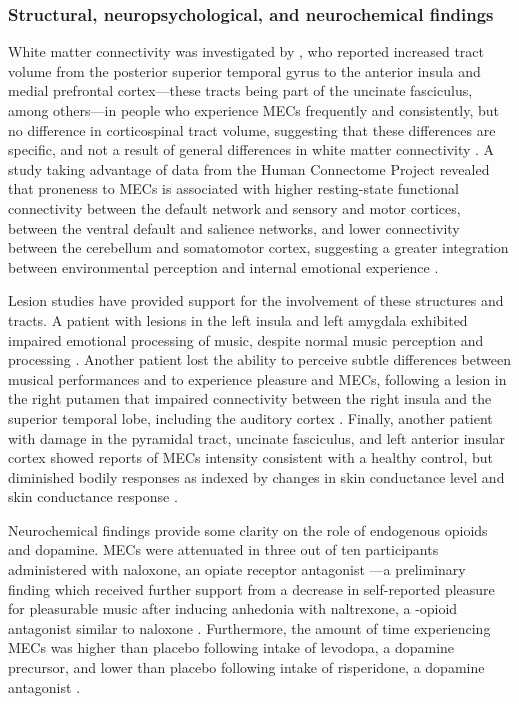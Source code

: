 \subsubsection{Structural, neuropsychological, and neurochemical findings}

White matter connectivity was investigated by \textcite{sachs2016}, who reported increased tract volume from the posterior superior temporal gyrus to the anterior insula and medial prefrontal cortex---these tracts being part of the uncinate fasciculus, among others---in people who experience MECs frequently and consistently, but no difference in corticospinal tract volume, suggesting that these differences are specific, and not a result of general differences in white matter connectivity \parencite{sachs2016}. A study taking advantage of data from the Human Connectome Project \parencite{vanessen2013} revealed that proneness to MECs is associated with higher resting-state functional connectivity between the default network and sensory and motor cortices, between the ventral default and salience networks, and lower connectivity between the cerebellum and somatomotor cortex, suggesting a greater integration between environmental perception and internal emotional experience \parencite{williams2018}.

Lesion studies have provided support for the involvement of these structures and tracts. A patient with lesions in the left insula and left amygdala exhibited impaired emotional processing of music, despite normal music perception and processing \parencite{griffiths2004}. Another patient lost the ability to perceive subtle differences between musical performances and to experience pleasure and MECs, following a lesion in the right putamen that impaired connectivity between the right insula and the superior temporal lobe, including the auditory cortex \parencite{satoh2016}. Finally, another patient with damage in the pyramidal tract, uncinate fasciculus, and left anterior insular cortex showed reports of MECs intensity consistent with a healthy control, but diminished bodily responses as indexed by changes in skin conductance level and skin conductance response \parencite{grunkina2017}.

Neurochemical findings provide some clarity on the role of endogenous opioids and dopamine. MECs were attenuated in three out of ten participants administered with naloxone, an opiate receptor antagonist \parencite{goldstein1980}---a preliminary finding which received further support from a decrease in self-reported pleasure for pleasurable music after inducing anhedonia with naltrexone, a {\textmu}-opioid antagonist similar to naloxone \parencite{mallik2017}. Furthermore, the amount of time experiencing MECs was higher than placebo following intake of levodopa, a dopamine precursor, and lower than placebo following intake of risperidone, a dopamine antagonist \parencite{ferreri2019}.


